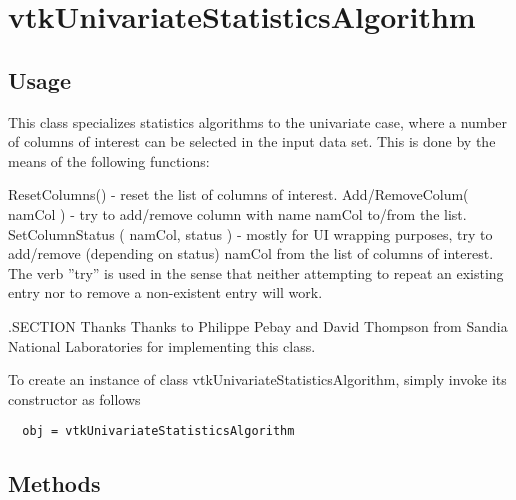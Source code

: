 \section{vtkUnivariateStatisticsAlgorithm}

\subsection{Usage}

 This class specializes statistics algorithms to the univariate case, where
 a number of columns of interest can be selected in the input data set.
 This is done by the means of the following functions:

 ResetColumns() - reset the list of columns of interest.
 Add/RemoveColum( namCol ) - try to add/remove column with name namCol to/from
 the list.
 SetColumnStatus ( namCol, status ) - mostly for UI wrapping purposes, try to 
 add/remove (depending on status) namCol from the list of columns of interest.
 The verb ''try'' is used in the sense that neither attempting to 
 repeat an existing entry nor to remove a non-existent entry will work.
 
 .SECTION Thanks
 Thanks to Philippe Pebay and David Thompson from Sandia National Laboratories 
 for implementing this class.

To create an instance of class vtkUnivariateStatisticsAlgorithm, simply
invoke its constructor as follows
\begin{verbatim}
  obj = vtkUnivariateStatisticsAlgorithm
\end{verbatim}
\subsection{Methods}

